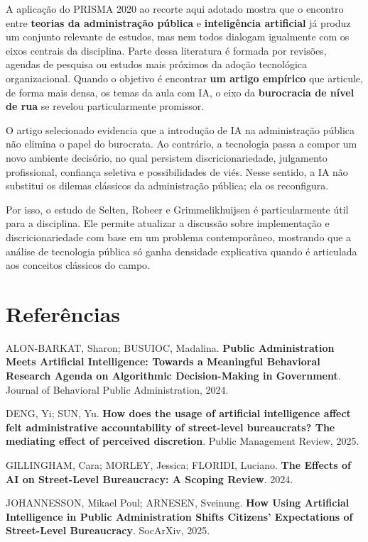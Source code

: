 \documentclass[12pt]{article}
\begin{document}
A aplicação do PRISMA 2020 ao recorte aqui adotado mostra que o encontro entre \textbf{teorias da administração pública} e \textbf{inteligência artificial} já produz um conjunto relevante de estudos, mas nem todos dialogam igualmente com os eixos centrais da disciplina. Parte dessa literatura é formada por revisões, agendas de pesquisa ou estudos mais próximos da adoção tecnológica organizacional. Quando o objetivo é encontrar \textbf{um artigo empírico} que articule, de forma mais densa, os temas da aula com IA, o eixo da \textbf{burocracia de nível de rua} se revelou particularmente promissor.

O artigo selecionado evidencia que a introdução de IA na administração pública não elimina o papel do burocrata. Ao contrário, a tecnologia passa a compor um novo ambiente decisório, no qual persistem discricionariedade, julgamento profissional, confiança seletiva e possibilidades de viés. Nesse sentido, a IA não substitui os dilemas clássicos da administração pública; ela os reconfigura.

Por isso, o estudo de Selten, Robeer e Grimmelikhuijsen é particularmente útil para a disciplina. Ele permite atualizar a discussão sobre implementação e discricionariedade com base em um problema contemporâneo, mostrando que a análise de tecnologia pública só ganha densidade explicativa quando é articulada aos conceitos clássicos do campo.

\section{Referências}
\label{sec:org50faae0}

ALON-BARKAT, Sharon; BUSUIOC, Madalina. \textbf{Public Administration Meets Artificial Intelligence: Towards a Meaningful Behavioral Research Agenda on Algorithmic Decision-Making in Government}. Journal of Behavioral Public Administration, 2024.

DENG, Yi; SUN, Yu. \textbf{How does the usage of artificial intelligence affect felt administrative accountability of street-level bureaucrats? The mediating effect of perceived discretion}. Public Management Review, 2025.

GILLINGHAM, Cara; MORLEY, Jessica; FLORIDI, Luciano. \textbf{The Effects of AI on Street-Level Bureaucracy: A Scoping Review}. 2024.

JOHANNESSON, Mikael Poul; ARNESEN, Sveinung. \textbf{How Using Artificial Intelligence in Public Administration Shifts Citizens’ Expectations of Street-Level Bureaucracy}. SocArXiv, 2025.
\end{document}
